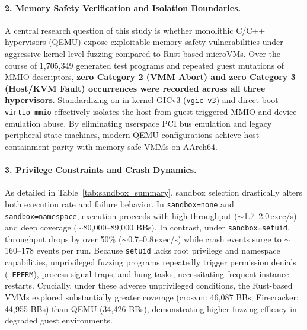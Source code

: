\documentclass{article}
\begin{document}
\paragraph{2. Memory Safety Verification and Isolation Boundaries.}
A central research question of this study is whether monolithic C/C++ hypervisors (QEMU) expose exploitable memory safety vulnerabilities under aggressive kernel-level fuzzing compared to Rust-based microVMs. Over the course of 1,705,349 generated test programs and repeated guest mutations of MMIO descriptors, \textbf{zero Category 2 (VMM Abort) and zero Category 3 (Host/KVM Fault) occurrences were recorded across all three hypervisors}. Standardizing on in-kernel GICv3 (\texttt{vgic-v3}) and direct-boot \texttt{virtio-mmio} effectively isolates the host from guest-triggered MMIO and device emulation abuse. By eliminating userspace PCI bus emulation and legacy peripheral state machines, modern QEMU configurations achieve host containment parity with memory-safe VMMs on AArch64.

\paragraph{3. Privilege Constraints and Crash Dynamics.}
As detailed in Table~\ref{tab:sandbox_summary}, sandbox selection drastically alters both execution rate and failure behavior. In \texttt{sandbox=none} and \texttt{sandbox=namespace}, execution proceeds with high throughput ($\sim$1.7--2.0\,exec/s) and deep coverage ($\sim$80,000--89,000 BBs). In contrast, under \texttt{sandbox=setuid}, throughput drops by over 50\% ($\sim$0.7--0.8\,exec/s) while crash events surge to $\sim$160--178 events per run. Because \texttt{setuid} lacks root privilege and namespace capabilities, unprivileged fuzzing programs repeatedly trigger permission denials (\texttt{-EPERM}), process signal traps, and hung tasks, necessitating frequent instance restarts. Crucially, under these adverse unprivileged conditions, the Rust-based VMMs explored substantially greater coverage (crosvm: 46,087 BBs; Firecracker: 44,955 BBs) than QEMU (34,426 BBs), demonstrating higher fuzzing efficacy in degraded guest environments.
\end{document}
